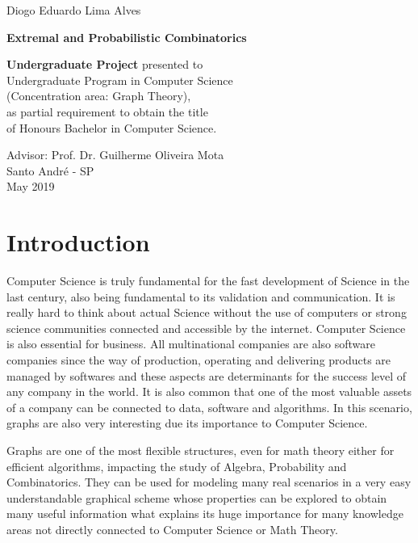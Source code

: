 \documentclass[12pt,twoside,a4paper,bibliography=totocnumbered]{book}
\numberwithin{equation}{section}
\theoremstyle{remark}
\begin{document}
\newpage
\begin{center}
Diogo Eduardo Lima Alves
\end{center}
   \begin{center}
        \vspace*{4 cm}
        \textbf{\Large{Extremal and Probabilistic Combinatorics}}\\
        \vspace*{5cm}
    \end{center}

    \begin{flushright}
{\bf Undergraduate Project} presented to\\ 
Undergraduate Program in Computer Science\\ 
(Concentration area: Graph Theory),\\ 
as partial requirement to obtain the title\\ 
of Honours Bachelor in Computer Science.
    \end{flushright}

\vspace{3cm}
\begin{center}
Advisor: Prof. Dr. Guilherme Oliveira Mota\\
\vfill
Santo André - SP\\
May 2019
\end{center}
\tableofcontents
\listoffigures

\chapter{Introduction}
Computer Science is truly fundamental for the fast development of Science in the last century, also being fundamental to its validation and communication. It is really hard to think about actual Science without the use of computers or strong science communities connected and accessible by the internet. Computer Science is also essential for business. All multinational companies are also software companies since the way of production, operating and delivering products are managed by softwares and these aspects are determinants for the success level of any company in the world. It is also common that one of the most valuable assets of a company can be connected to data, software and algorithms. In this scenario, graphs are also very interesting due its importance to Computer Science.

Graphs are one of the most flexible structures, even for math theory either for efficient algorithms, impacting the study of Algebra, Probability and Combinatorics. They can be used for modeling many real scenarios in a very easy understandable graphical scheme whose properties can be explored to obtain many useful information what explains its huge importance for many knowledge areas not directly connected to Computer Science or Math Theory.   
\end{document}
